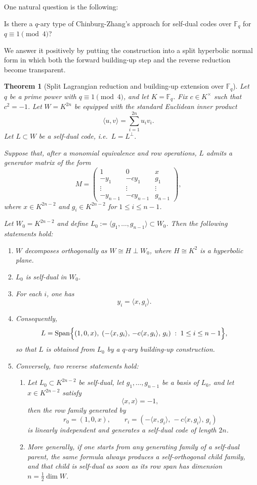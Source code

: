 \documentclass[12pt]{article}
\newtheorem{theorem}{Theorem}[section]
\newenvironment{blueblock}{\begingroup\color{blue}}{\endgroup}
\begin{document}
One natural question is the following:

Is there a  $q$-ary type of Chinburg-Zhang's approach for self-dual codes over $\mathbb F_q$ for $q \equiv 1 \pmod{4}$?

We answer it positively by putting the construction into a split hyperbolic normal form in which both the forward building-up step and the reverse reduction become transparent.

\begin{blueblock}
\begin{theorem}[Split Lagrangian reduction and building-up extension over $\mathbb{F}_q$]\label{thm:qary-building-up}
Let $q$ be a prime power with $q \equiv 1 \pmod{4}$, and let $K=\mathbb{F}_q$.
Fix $c \in K^\times$ such that $c^2=-1$.
Let $W=K^{2n}$ be equipped with the standard Euclidean inner product
\[
\langle u,v\rangle = \sum_{i=1}^{2n} u_i v_i.
\]
Let $L \subset W$ be a self-dual code, i.e.\ $L=L^\perp$.

Suppose that, after a monomial equivalence and row operations, $L$ admits a generator matrix of the form
\[
M=
\begin{pmatrix}
1 & 0 & x\\
-y_1 & -c y_1 & g_1\\
\vdots & \vdots & \vdots\\
-y_{n-1} & -c y_{n-1} & g_{n-1}
\end{pmatrix},
\]
where $x \in K^{2n-2}$ and $g_i \in K^{2n-2}$ for $1 \le i \le n-1$.

Let $W_0 = K^{2n-2}$ and define $L_0 := \langle g_1,\dots,g_{n-1}\rangle \subset W_0$.
Then the following statements hold:
\begin{enumerate}
\item $W$ decomposes orthogonally as $W \cong H \perp W_0$, where $H \cong K^2$ is a hyperbolic plane.
\item $L_0$ is self-dual in $W_0$.
\item For each $i$, one has
\[
y_i = \langle x, g_i\rangle.
\]
\item Consequently,
\[
L = \operatorname{Span}\Bigl\{(1,0,x),\;
(-\langle x,g_i\rangle,\,-c\langle x,g_i\rangle,\,g_i)\;:\;1 \le i \le n-1\Bigr\},
\]
so that $L$ is obtained from $L_0$ by a $q$-ary building-up construction.
\item Conversely, two reverse statements hold:
\begin{enumerate}[label=(5\alph*)]
\item Let $L_0 \subset K^{2n-2}$ be self-dual, let $g_1,\dots,g_{n-1}$ be a basis of $L_0$, and let $x \in K^{2n-2}$ satisfy
\[
\langle x,x\rangle = -1,
\]
then the row family generated by
\[
r_0 = (1,0,x), \qquad
r_i = (-\langle x,g_i\rangle,\,-c\langle x,g_i\rangle,\,g_i)
\]
is linearly independent and generates a self-dual code of length $2n$.
\item More generally, if one starts from any generating family of a self-dual parent, the same formula always produces a self-orthogonal child family, and that child is self-dual as soon as its row span has dimension $n=\frac12 \dim W$.
\end{enumerate}
\end{enumerate}
\end{theorem}


\end{blueblock}
\end{document}
